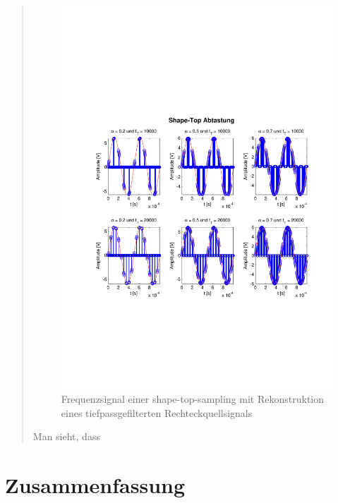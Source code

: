 \begin{quote}
    	\begin{figure}[H]
    \centering
        \includegraphics[scale=0.7, trim = 0cm 0cm 0cm 0cm,
        clip]{./Bilder/shape-top-zeit_3V}
            \caption{Frequenzsignal einer shape-top-sampling mit Rekonstruktion
            eines tiefpassgefilterten Rechteckquellsignals}
  	    \end{figure}
    	
    
    	Man sieht, dass
    	
    \end{quote}%
    
    \section{Zusammenfassung}
    \begin{quote}
    \end{quote}%
         

